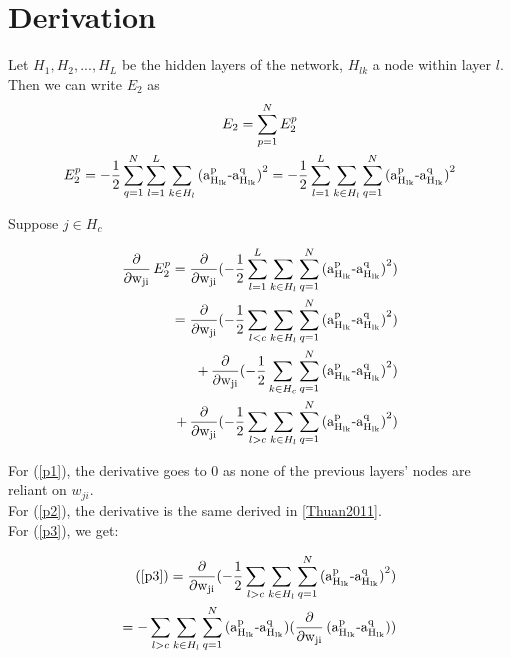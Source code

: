 \section{Derivation}
\label{sec:derivation}

Let $H_1, H_2,...,H_L$ be the hidden layers of the network, $H_{lk}$ a node within layer $l$. Then we can write $E_2$ as 
\begin{gather}
    E_2 = \sum_{p=1}^N E_2^p \\
    E_2^p = -\frac{1}{2}\sum_{q=1}^N\sum_{l=1}^L\sum_{k\in H_{l}} \operatorname{(a_{H_{lk}}^p - a_{H_{lk}}^q)}^2 = -\frac{1}{2}\sum_{l=1}^L\sum_{k\in H_{l}}\sum_{q=1}^N \operatorname{(a_{H_{lk}}^p - a_{H_{lk}}^q)}^2
\end{gather}

Suppose $j\in H_c$

\begin{align}
    \Deriv E_2^p = \Deriv (-\frac{1}{2}\sum_{l=1}^L\sum_{k\in H_{l}}\sum_{q=1}^N \Diff^2) \\
    = \Deriv (-\frac{1}{2}\sum_{l<c}\sum_{k\in H_{l}}\sum_{q=1}^N \Diff^2) \label{p1}\\
    + \Deriv (-\frac{1}{2}\sum_{k\in H_{c}}\sum_{q=1}^N \Diff^2) \label{p2}  \\
    + \Deriv (-\frac{1}{2}\sum_{l>c}\sum_{k\in H_{l}}\sum_{q=1}^N \Diff^2) \label{p3}
\end{align}

For (\ref{p1}), the derivative goes to 0 as none of the previous layers' nodes are reliant on $w_{ji}$. \\
For (\ref{p2}), the derivative is the same derived in \ref{Thuan2011}. \\
For (\ref{p3}), we get:

\begin{align}
    (\ref{p3}) = \Deriv (-\frac{1}{2}\sum_{l>c}\sum_{k\in H_{l}}\sum_{q=1}^N \Diff^2) \\
    = -\sum_{l>c}\sum_{k\in H_{l}}\sum_{q=1}^N \Diff (\Deriv\Diff) \label{deriv_gen}\\
\end{align}

